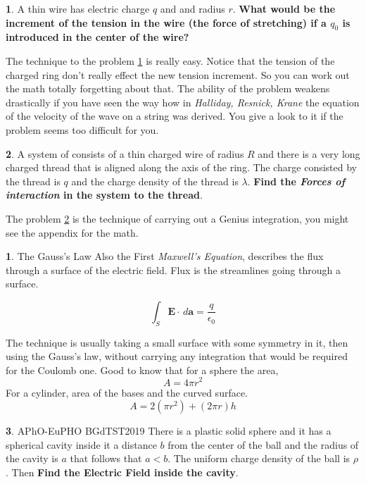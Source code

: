 \documentclass[11pt,a4paper,twocolumn]{article}
\renewcommand{\vec}[1]{\boldsymbol{#1}}
\theoremstyle{definition}
\newtheorem{fct}{ \framebox[0.05\textwidth]{Fact} }
\theoremstyle{definition}
\newtheorem{pr}{ \framebox[0.05\textwidth]{Pr} }
\theoremstyle{definition}
\theoremstyle{definition}
\begin{document}
\begin{pr} \label{pr2}
A thin wire has electric charge $q$ and and radius $r$. \textbf{What would be the increment of the tension in the wire (the force of stretching) if a $q_0$ is introduced in the center of the wire?}
\end{pr}

The technique to the problem \ref{pr2} is really easy. Notice that the tension of the charged ring don't really effect the new tension increment. So you can work out the math totally forgetting about that. The ability of the problem weakens drastically if you have seen the way how in \emph{Halliday, Resnick, Krane} the equation of the velocity of the wave on a string was derived. You give a look to it if the problem seems too difficult for you.

\begin{pr} \label{:pr3}
A system of consists of a thin charged wire of radius $R$ and there is a very long charged thread that is aligned along the axis of the ring. The charge consisted by the thread is $q$ and the charge density of the thread is $\lambda$. \textbf{Find the \emph{Forces of interaction} in the system to the thread}.
\end{pr}
 
 The problem \ref{:pr3} is the technique of carrying out a Genius integration, you might see the appendix for the math.

\begin{fct}
\textsf{The Gauss's Law} Also the First \emph{Maxwell's Equation}, describes the flux through a surface of the electric field. Flux is the streamlines going through a surface. 

\[ \int_{S} \vec{E} \cdot \, d \vec{a} = \frac{q}{\epsilon_0} \]

The technique is usually taking a small surface with some symmetry in it, then using the Gauss's law, without carrying any integration that would be required for the Coulomb one. Good to know that for a sphere the area, 
\[ A = 4 \pi r^2 \]
For a cylinder, area of the bases and the curved surface.
\[ A = 2( \pi r^2 ) + (2 \pi r) h \]

\end{fct}


\begin{pr} \label{pr4}
\textsf{APhO-EuPHO BGdTST2019} There is a plastic solid sphere and it has a spherical cavity inside it a distance $b$ from the center of the ball and the radius of the cavity is $a$ that follows that $a <b$. The uniform charge density of the ball is $\rho$. Then \textbf{Find the Electric Field inside the cavity}.
\end{pr}
\end{document}
